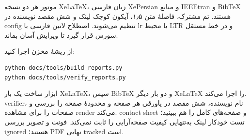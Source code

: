 موتور هر دو نسخه XeLaTeX، زبان فارسی XePersian و منابع IEEEtran و BibTeX هستند. تم مشترک، فاصلهٔ متن ۱٫۵، آیکون کوچک لینک و شش مقصد نویسنده در config تنظیم می‌شوند. اصطلاح لاتین فارسی با lr یا محیط LTR و در خط مستقل سورس قرار گیرد تا ویرایش آسان بماند.

از ریشهٔ مخزن اجرا کنید:
\begin{LTR}
\begin{lstlisting}[language={},numbers=none]
python docs/tools/build_reports.py
python docs/tools/verify_reports.py
\end{lstlisting}
\end{LTR}
ابزار ساخت یک بار XeLaTeX، سپس BibTeX و دو بار دیگر XeLaTeX را اجرا می‌کند. verifier، نام نویسنده، شش مقصد در پاورقی هر صفحه و محدودهٔ صفحه را بررسی و صفحات را برای مشاهده render می‌کند. contact sheet و صفحه‌های کامل را هم ببینید؛ تست خودکار لینک به‌تنهایی کیفیت صفحه‌آرایی را ثابت نمی‌کند. فونت و تصویر بررسی ignored هستند؛ PDF نهایی tracked است.
